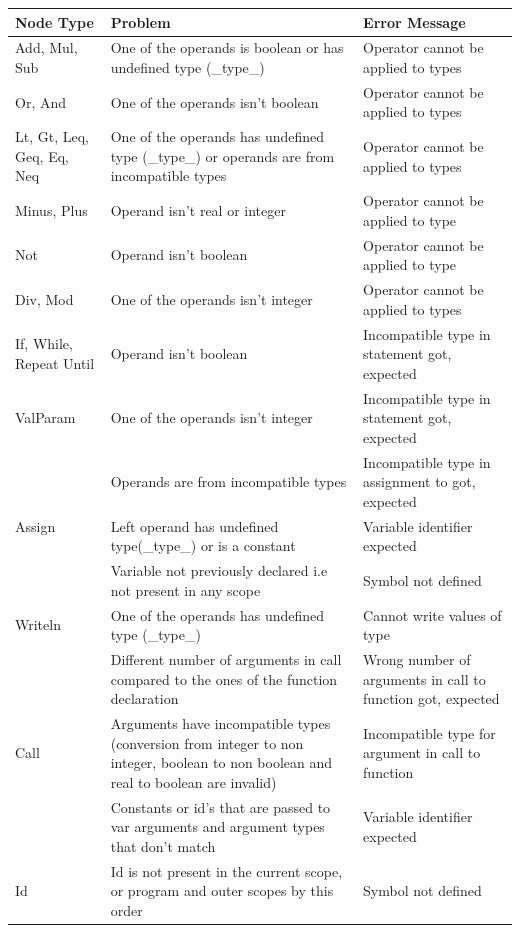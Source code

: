 \documentclass[12pt]{article}
\begin{document}
\begin{longtable} {|p{3.0cm} | p{8cm} | p{4.0cm}|} 
 \textbf{Node Type} 	& \textbf{Problem} & \textbf{Error Message} \\ \hline
	Add, Mul, Sub 		& One of the operands is boolean or has undefined type (\_type\_) & Operator cannot be applied to types \\ \hline
	Or, And 			& One of the operands isn't boolean & Operator cannot be applied to types \\ \hline
	Lt, Gt, Leq, Geq, Eq, Neq &		One of the operands has undefined type (\_type\_) or operands are from incompatible types & Operator cannot be applied to types \\ \hline
	Minus, Plus 		& Operand isn't real or integer & Operator cannot be applied to type \\ \hline
	Not 				& Operand isn't boolean & Operator cannot be applied to type \\ \hline
	Div, Mod 			& One of the operands isn't integer & Operator cannot be applied to types \\ \hline
	If, While, Repeat Until & Operand isn't boolean & Incompatible type in statement got, expected \\ \hline
	ValParam 			& One of the operands isn't integer & Incompatible type in statement got, expected \\ \hline
	\multirow{3}{*}{Assign} & Operands are from incompatible types & Incompatible type in assignment to got, expected \\ \cline{2-3}
							& Left operand has undefined type(\_type\_) or is a constant & Variable identifier expected \\ \cline{2-3}
							& Variable not previously declared i.e not present in any scope & Symbol not defined \\ \hline
	Writeln 			& One of the operands has undefined type (\_type\_) & Cannot write values of type \\ \hline
	\multirow{3}{*}{Call} 	& Different number of arguments in call compared to the ones of the function declaration & Wrong number of arguments in call to function got, expected \\ \cline{2-3}
	 					& Arguments have incompatible types (conversion from integer to non integer, boolean to non boolean and real to boolean are invalid) & Incompatible type for argument in call to function  \\ \cline{2-3}
						& Constants or id's that are passed to var arguments and argument types that don't match & Variable identifier expected  \\ \hline
	Id 					& Id is not present in the current scope, or program and outer scopes by this order & Symbol not defined  \\ \hline

\end{longtable}
\end{document}
